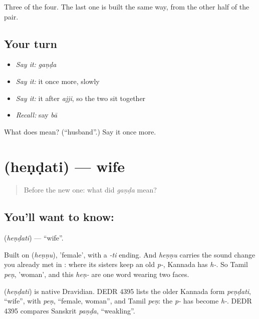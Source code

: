 \begin{grammarlens}[title={What you've built}]
Three of the four. The last one is built the same way, from the other half of the pair.
\end{grammarlens}

\subsection*{Your turn}
\begin{itemize}
\raggedright
  \item \emph{Say it:} \emph{gaṇḍa}
  \item \emph{Say it:} it once more, slowly
  \item \emph{Say it:} it after \emph{ajji}, so the two sit together
  \item \emph{Recall:} say \emph{bā}
\end{itemize}

\begin{tcolorbox}[breakable,colback=teal!4,colframe=teal!35!black,title={Before you move on}]
What does  mean? (\textquotedblleft{}husband\textquotedblright{}.) Say it once more.
\end{tcolorbox}
\section[\texorpdfstring{\kn{ಹೆಂಡತಿ} (heṇḍati)}{ಹೆಂಡತಿ (heṇḍati)}]{ (heṇḍati) — wife}

\label{lesson:KA-C45-wife}



\begin{quote}
Before the new one: what did \emph{gaṇḍa} mean?
\end{quote}

\subsection*{You'll want to know: }
\textbf{} (\emph{heṇḍati}) — \textquotedblleft{}wife\textquotedblright{}.

Built on  (\emph{heṇṇu}), 'female', with a \emph{-ti} ending. And \emph{heṇṇu} carries the sound change you already met in : where its sisters keep an old \emph{p-}, Kannada has \emph{h-}. So Tamil \emph{peṇ}, 'woman', and this \emph{heṇ-} are one word wearing two faces.

\begin{cousinweb}
\textbf{} (\emph{heṇḍati}) is native Dravidian. DEDR 4395 lists the older Kannada form \emph{peṇḍati}, \textquotedblleft{}wife\textquotedblright{}, with \emph{peṇ}, \textquotedblleft{}female, woman\textquotedblright{}, and Tamil \emph{peṇ}: the \emph{p-} has become \emph{h-}. DEDR 4395 compares Sanskrit \emph{paṇḍa}, \textquotedblleft{}weakling\textquotedblright{}.
\end{cousinweb}


